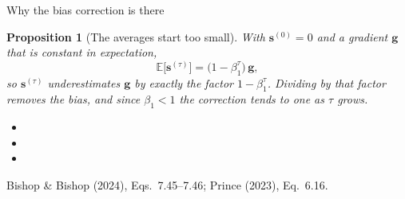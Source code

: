 \documentclass[aspectratio=169, 11pt]{beamer}
\newtheorem{propx}[theorem]{Proposition}
\newcommand{\srcline}[1]{%
  \par\vspace{0.25em}%
  {\scriptsize\color{mcMuted}\hfill #1\par}}
\newcommand{\src}[3]{}      %
\begin{document}
\begin{frame}{Why the bias correction is there}
  \src{bishop2024}{equation}{7.45-7.46}
  \src{bishop2024}{section}{7.3.3}
  \src{kingma2015}{equation}{1-4}
  \src{kingma2015}{section}{3}
  \src{prince2023}{equation}{6.16}
  \vspace{-0.25em}
  \begin{propx}[The averages start too small]\label{th:bias}
    \small
    With $\mathbf{s}^{(0)} = 0$ and a gradient $\mathbf{g}$ that is constant in
    expectation,
    \[
      \mathbb{E}\big[\mathbf{s}^{(\tau)}\big]
        = \big(1 - \beta_1^{\tau}\big)\, \mathbf{g} ,
    \]
    so $\mathbf{s}^{(\tau)}$ underestimates $\mathbf{g}$ by exactly the factor
    $1 - \beta_1^{\tau}$. Dividing by that factor removes the bias, and
    since $\beta_1 < 1$ the correction tends to one as $\tau$ grows.
  \end{propx}
  \vspace{0.05em}
  {\footnotesize
  \begin{itemize}\itemsep0.26em
    \item {}
    \item {}
    \item {}
  \end{itemize}}
  \vspace{-0.3em}
  \srcline{Bishop \& Bishop (2024), Eqs.~7.45--7.46; Prince (2023),
  Eq.~6.16.}
\end{frame}
\end{document}

